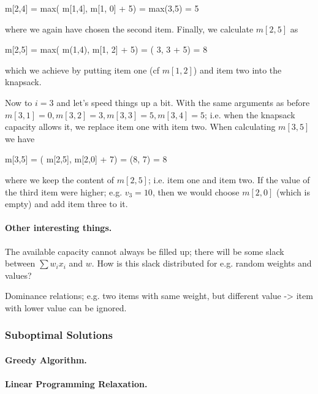 \bee
m[2,4] = max( m[1,4], m[1, 0] + 5) = max(3,5) = 5
\eee

where we again have chosen the second item. Finally, we calculate $m[2,5]$ as

\bee
m[2,5] = max( m(1,4), m[1, 2] + 5) = \max( 3, 3 + 5) = 8
\eee

which we achieve by putting item one (cf $m[1,2]$) and item two into the knapsack.

Now to $i = 3$ and let's speed things up a bit. With the same arguments as before $m[3,1] = 0, m[3,2] = 3, m[3,3] = 5, m[3,4] = 5$; i.e. when the knapsack capacity allows it, we replace item one with item two. When calculating $m[3,5]$ we have

\bee
m[3,5] = \max( m[2,5], m[2,0] + 7) = \max(8, 7) = 8
\eee

where we keep the content of $m[2,5]$; i.e. item one and item two. If the value of the third item were higher; e.g. $v_3 = 10$, then we would choose $m[2,0]$ (which is empty) and add item three to it.

\paragraph{Other interesting things.} The available capacity cannot always be filled up; there will be some slack between $\sum w_i x_i$ and $w$. How is this slack distributed for e.g. random weights and values?

Dominance relations; e.g. two items with same weight, but different value -> item with lower value can be ignored.


\subsubsection{Suboptimal Solutions}

\paragraph{Greedy Algorithm.}

\paragraph{Linear Programming Relaxation.}


